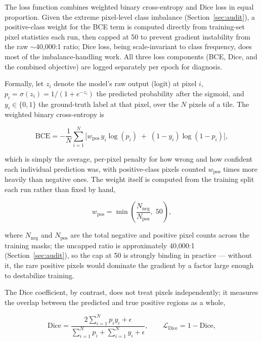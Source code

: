 \documentclass[11pt,a4paper]{article}
\begin{document}
The loss function combines weighted binary cross-entropy and Dice loss in
equal proportion. Given the extreme pixel-level class imbalance
(Section~\ref{sec:audit}), a positive-class weight for the BCE term is
computed directly from training-set pixel statistics each run, then capped
at 50 to prevent gradient instability from the raw $\sim$40{,}000:1 ratio;
Dice loss, being scale-invariant to class frequency, does most of the
imbalance-handling work. All three loss components (BCE, Dice, and the
combined objective) are logged separately per epoch for diagnosis.

Formally, let $z_i$ denote the model's raw output (logit) at pixel $i$,
$p_i = \sigma(z_i) = 1/(1+e^{-z_i})$ the predicted probability after the
sigmoid, and $y_i \in \{0,1\}$ the ground-truth label at that pixel, over
the $N$ pixels of a tile. The weighted binary cross-entropy is

\begin{equation}
\mathrm{BCE} = -\frac{1}{N} \sum_{i=1}^{N} \Big[ w_{\mathrm{pos}} \, y_i \log(p_i) \;+\; (1-y_i)\log(1-p_i) \Big],
\label{eq:bce}
\end{equation}

which is simply the average, per-pixel penalty for how wrong and how
confident each individual prediction was, with positive-class pixels
counted $w_{\mathrm{pos}}$ times more heavily than negative ones. The
weight itself is computed from the training split each run rather than
fixed by hand,

\begin{equation}
w_{\mathrm{pos}} = \min\!\left( \frac{N_{\mathrm{neg}}}{N_{\mathrm{pos}}},\; 50 \right),
\label{eq:posweight}
\end{equation}

where $N_{\mathrm{neg}}$ and $N_{\mathrm{pos}}$ are the total negative and
positive pixel counts across the training masks; the uncapped ratio is
approximately 40{,}000:1 (Section~\ref{sec:audit}), so the cap at 50 is
strongly binding in practice --- without it, the rare positive pixels would
dominate the gradient by a factor large enough to destabilize training.

The Dice coefficient, by contrast, does not treat pixels independently; it
measures the overlap between the predicted and true positive regions as a
whole,

\begin{equation}
\mathrm{Dice} = \frac{2\sum_{i=1}^{N} p_i y_i + \epsilon}{\sum_{i=1}^{N} p_i + \sum_{i=1}^{N} y_i + \epsilon}, \qquad
\mathcal{L}_{\mathrm{Dice}} = 1 - \mathrm{Dice},
\label{eq:dice}
\end{equation}
\end{document}
